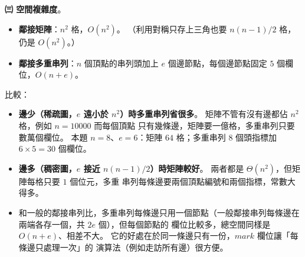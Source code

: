 \begin{pastsoln}
\textbf{㈢ 空間複雜度}。
\begin{itemize}
\item \textbf{鄰接矩陣}：$n^2$ 格，$O(n^2)$。 （利用對稱只存上三角也要 $n(n-1)/2$ 格，仍是 $O(n^2)$。）
\item \textbf{鄰接多重串列}：$n$ 個頂點的串列頭加上 $e$ 個邊節點，每個邊節點固定 $5$ 個欄位，$O(n + e)$。
\end{itemize}
比較：
\begin{itemize}
\item \textbf{邊少（稀疏圖，$e$ 遠小於 $n^2$）時多重串列省很多}。 矩陣不管有沒有邊都佔 $n^2$ 格，例如 $n = 10000$ 而每個頂點
只有幾條邊，矩陣要一億格，多重串列只要數萬個欄位。 本題 $n = 8$、$e = 6$：矩陣 $64$ 格；多重串列 $8$ 個頭指標加
$6 \times 5 = 30$ 個欄位。
\item \textbf{邊多（稠密圖，$e$ 接近 $n(n-1)/2$）時矩陣較好}。 兩者都是 $\Theta(n^2)$，但矩陣每格只要 $1$ 個位元，多重
串列每條邊要兩個頂點編號和兩個指標，常數大得多。
\item 和一般的鄰接串列比，多重串列每條邊只用一個節點（一般鄰接串列每條邊在兩端各存一個，共 $2e$ 個），但每個節點的
欄位比較多，總空間同樣是 $O(n + e)$、相差不大。 它的好處在於同一條邊只有一份，$\mathit{mark}$ 欄位讓「每條邊只處理一次」的
演算法（例如走訪所有邊）很方便。
\end{itemize}
\end{pastsoln}
